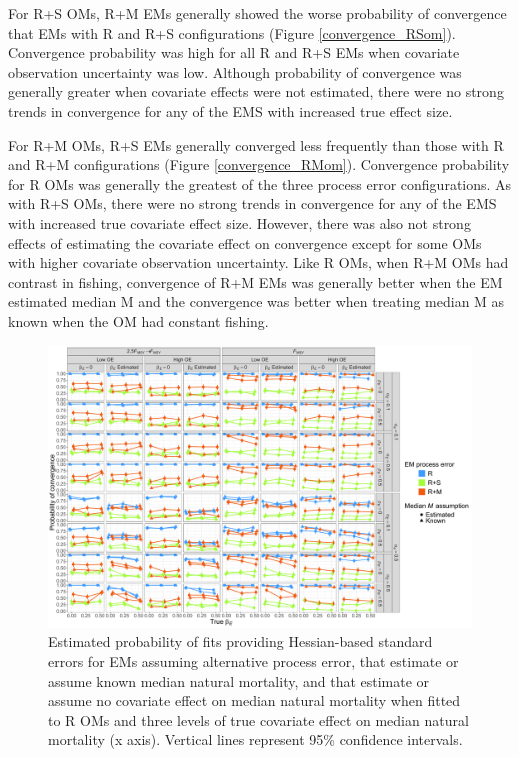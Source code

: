\documentclass[
  12pt,
]{article}
\begin{document}
For R+S OMs, R+M EMs generally showed the worse probability of convergence that EMs with R and R+S configurations (Figure \ref{convergence_RSom}). Convergence probability was high for all R and R+S EMs when covariate observation uncertainty was low. Although probability of convergence was generally greater when covariate effects were not estimated, there were no strong trends in convergence for any of the EMS with increased true effect size.

For R+M OMs, R+S EMs generally converged less frequently than those with R and R+M configurations (Figure \ref{convergence_RMom}). Convergence probability for R OMs was generally the greatest of the three process error configurations. As with R+S OMs, there were no strong trends in convergence for any of the EMS with increased true covariate effect size. However, there was also not strong effects of estimating the covariate effect on convergence except for some OMs with higher covariate observation uncertainty. Like R OMs, when R+M OMs had contrast in fishing, convergence of R+M EMs was generally better when the EM estimated median M and the convergence was better when treating median M as known when the OM had constant fishing.

\begin{landscape}
\begin{figure}
\begin{center}
\includegraphics{convergence_Rom}
\end{center}
\caption{Estimated probability of fits providing Hessian-based standard errors for EMs assuming alternative process error, that estimate or assume known median natural mortality, and that estimate or assume no covariate effect on median natural mortality when fitted to R OMs and three levels of true covariate effect on median natural mortality (x axis). Vertical lines represent 95\% confidence intervals.}\label{convergence_Rom}
\end{figure}
\end{landscape}
\end{document}

